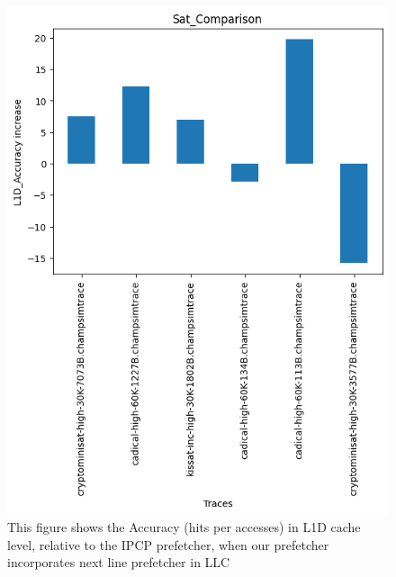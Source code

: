 \documentclass[conference]{IEEEtran}
\begin{document}
\begin{figure}
\includegraphics[scale=0.5]{Images/sat_l1d.png}
\caption{This figure shows the Accuracy (hits per accesses) in L1D cache level, relative to the IPCP prefetcher, when our prefetcher incorporates next line prefetcher in LLC}
\label{sat_l1d}
\end{figure}
\end{document}
